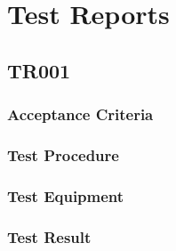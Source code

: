 \section{Test Reports}
\subsection{TR001}
\subsubsection{Acceptance Criteria}
\subsubsection{Test Procedure}
\subsubsection{Test Equipment}
\subsubsection{Test Result}

